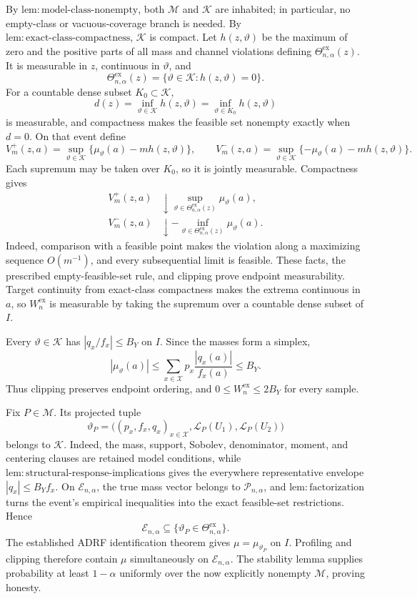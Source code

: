 By \(\mathrm{lem{:}model\text{-}class\text{-}nonempty}\), both \(\mathcal M\) and \(\mathscr K\) are inhabited; in particular, no empty-class or vacuous-coverage branch is needed.  By \(\mathrm{lem{:}exact\text{-}class\text{-}compactness}\), \(\mathscr K\) is compact.  Let \(h(z,\vartheta)\) be the maximum of zero and the positive parts of all mass and channel violations defining \(\Theta^{\mathrm{ex}}_{n,\alpha}(z)\).  It is measurable in \(z\), continuous in \(\vartheta\), and
\[
 \Theta^{\mathrm{ex}}_{n,\alpha}(z)
 =\{\vartheta\in\mathscr K:h(z,\vartheta)=0\}.
\]
For a countable dense subset \(K_0\subset\mathscr K\),
\[
 d(z)=\inf_{\vartheta\in\mathscr K}h(z,\vartheta)
     =\inf_{\vartheta\in K_0}h(z,\vartheta)
\]
is measurable, and compactness makes the feasible set nonempty exactly when \(d=0\).  On that event define
\[
 V_m^+(z,a)=\sup_{\vartheta\in\mathscr K}
 \{\mu_\vartheta(a)-mh(z,\vartheta)\},
 \qquad
 V_m^-(z,a)=\sup_{\vartheta\in\mathscr K}
 \{-\mu_\vartheta(a)-mh(z,\vartheta)\}.
\]
Each supremum may be taken over \(K_0\), so it is jointly measurable.  Compactness gives
\[
 \begin{aligned}
 V_m^+(z,a)&\downarrow
 \sup_{\vartheta\in\Theta^{\mathrm{ex}}_{n,\alpha}(z)}\mu_\vartheta(a),\\
 V_m^-(z,a)&\downarrow
 -\inf_{\vartheta\in\Theta^{\mathrm{ex}}_{n,\alpha}(z)}\mu_\vartheta(a).
 \end{aligned}
\]
Indeed, comparison with a feasible point makes the violation along a maximizing sequence \(O(m^{-1})\), and every subsequential limit is feasible.  These facts, the prescribed empty-feasible-set rule, and clipping prove endpoint measurability.  Target continuity from exact-class compactness makes the extrema continuous in \(a\), so \(W_n^{\mathrm{ex}}\) is measurable by taking the supremum over a countable dense subset of \(I\).

Every \(\vartheta\in\mathscr K\) has \(|q_x/f_x|\le B_Y\) on \(I\).  Since the masses form a simplex,
\[
 |\mu_\vartheta(a)|
 \le\sum_{x\in\mathcal X}p_x\frac{|q_x(a)|}{f_x(a)}
 \le B_Y.
\]
Thus clipping preserves endpoint ordering, and \(0\le W_n^{\mathrm{ex}}\le2B_Y\) for every sample.

Fix \(P\in\mathcal M\).  Its projected tuple
\[
 \vartheta_P=
 \bigl((p_x,f_x,q_x)_{x\in\mathcal X},
       \mathcal L_P(U_1),\mathcal L_P(U_2)\bigr)
\]
belongs to \(\mathscr K\).  Indeed, the mass, support, Sobolev, denominator, moment, and centering clauses are retained model conditions, while \(\mathrm{lem{:}structural\text{-}response\text{-}implications}\) gives the everywhere representative envelope \(|q_x|\le B_Yf_x\).  On \(\mathcal E_{n,\alpha}\), the true mass vector belongs to \(\mathcal P_{n,\alpha}\), and \(\mathrm{lem{:}factorization}\) turns the event's empirical inequalities into the exact feasible-set restrictions.  Hence
\[
 \mathcal E_{n,\alpha}
 \subseteq\{\vartheta_P\in\Theta^{\mathrm{ex}}_{n,\alpha}\}.
\]
The established ADRF identification theorem gives \(\mu=\mu_{\vartheta_P}\) on \(I\).  Profiling and clipping therefore contain \(\mu\) simultaneously on \(\mathcal E_{n,\alpha}\).  The stability lemma supplies probability at least \(1-\alpha\) uniformly over the now explicitly nonempty \(\mathcal M\), proving honesty.


